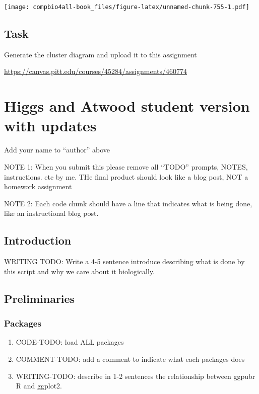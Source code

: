 \documentclass[
]{book}
\providecommand{\tightlist}{%
  \setlength{\itemsep}{0pt}\setlength{\parskip}{0pt}}
\begin{document}
\texttt{[image: compbio4all-book\_files/figure-latex/unnamed-chunk-755-1.pdf]}

\hypertarget{task-5}{%
\section{Task}\label{task-5}}

Generate the cluster diagram and upload it to this assignment

\url{https://canvas.pitt.edu/courses/45284/assignments/460774}

\hypertarget{higgs-and-atwood-student-version-with-updates}{%
\chapter{Higgs and Atwood student version with updates}\label{higgs-and-atwood-student-version-with-updates}}

Add your name to ``author'' above

NOTE 1: When you submit this please remove all ``TODO'' prompts, NOTES, instructions. etc by me. THe final product should look like a blog post, NOT a homework assignment

NOTE 2: Each code chunk should have a line that indicates what is being done, like an instructional blog post.

\hypertarget{introduction-9}{%
\section{Introduction}\label{introduction-9}}

WRITING TODO: Write a 4-5 sentence introduce describing what is done by this script and why we care about it biologically.

\hypertarget{preliminaries-17}{%
\section{Preliminaries}\label{preliminaries-17}}

\hypertarget{packages-5}{%
\subsection{Packages}\label{packages-5}}

\begin{enumerate}
\def\labelenumi{\arabic{enumi}.}
\tightlist
\item
  CODE-TODO: load ALL packages
\item
  COMMENT-TODO: add a comment to indicate what each packages does
\item
  WRITING-TODO: describe in 1-2 sentences the relationship between ggpubr R and ggplot2.
\end{enumerate}
\end{document}
